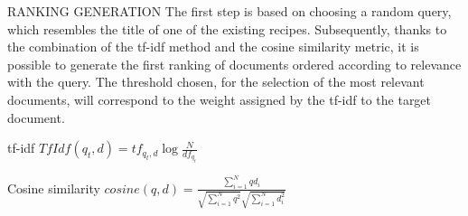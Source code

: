 \begin{frame}{RANKING GENERATION}
    The first step is based on choosing a random query, which resembles the title of one of the existing recipes. Subsequently, thanks to the combination of the tf-idf method and the cosine similarity metric, it is possible to generate the first ranking of documents ordered according to relevance with the query. The threshold chosen, for the selection of the most relevant documents, will correspond to the weight assigned by the tf-idf to the target document.
    \begin{minipage}{\linewidth}
        \centering
        \begin{minipage}{0.45\linewidth}
            \begin{block}{\centering tf-idf}
                \centering \small $ TfIdf(q_t,d) = tf_{q_t,d} \log\frac{N}{df_{q_t}}$
            \end{block}
        \end{minipage}
        \hspace{0.05\linewidth}
        \begin{minipage}{0.45\linewidth}
            \begin{block}{\centering Cosine similarity}
                \centering \small $ cosine(q,d) = \frac{\sum_{i=1}^Nqd_i}{\sqrt{\sum_{i=1}^Nq^2}\sqrt{\sum_{i=1}^Nd_i^2}} $
            \end{block}
        \end{minipage}
    \end{minipage}
\end{frame}

